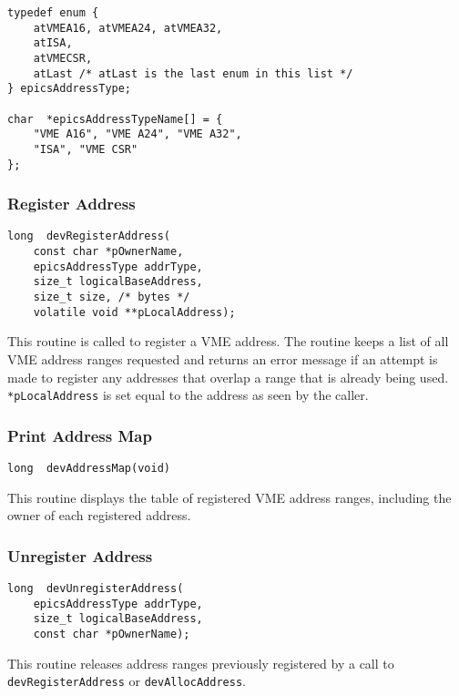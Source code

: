 \begin{verbatim}
typedef enum {
    atVMEA16, atVMEA24, atVMEA32,
    atISA,
    atVMECSR,
    atLast /* atLast is the last enum in this list */
} epicsAddressType;

char  *epicsAddressTypeName[] = {
    "VME A16", "VME A24", "VME A32",
    "ISA", "VME CSR"
};
\end{verbatim}

\subsubsection{Register Address}

\begin{verbatim}
long  devRegisterAddress(
    const char *pOwnerName,
    epicsAddressType addrType,
    size_t logicalBaseAddress,
    size_t size, /* bytes */
    volatile void **pLocalAddress);
\end{verbatim}

This routine is called to register a VME address. The routine keeps a list of all VME address ranges requested and returns 
an error message if an attempt is made to register any addresses that overlap a range that is already being used. 
\verb|*pLocalAddress| is set equal to the address as seen by the caller.

\subsubsection{Print Address Map}

\begin{verbatim}
long  devAddressMap(void)
\end{verbatim}

This routine displays the table of registered VME address ranges, including the owner of each registered address.

\subsubsection{Unregister Address}

\begin{verbatim}
long  devUnregisterAddress(
    epicsAddressType addrType,
    size_t logicalBaseAddress,
    const char *pOwnerName);
\end{verbatim}

This routine releases address ranges previously registered by a call to \verb|devRegisterAddress| or \verb|devAllocAddress|.


